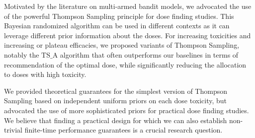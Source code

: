 Motivated by the literature on multi-armed bandit models, we advocated the use of the powerful Thompson Sampling principle for dose finding studies. This Bayesian randomized algorithm can be used in different contexts as it can leverage different prior information about the doses. For increasing toxicities and increasing or plateau efficacies, we proposed variants of Thompson Sampling, notably the $\mathrm{TS}\_\mathrm{A}$ algorithm that often outperforms our baselines in terms of recommendation of the optimal dose, while significantly reducing the allocation to doses with high toxicity. 

We provided theoretical guarantees for the simplest version of Thompson Sampling based on independent uniform priors on each dose toxicity, but advocated the use of more sophisticated priors for practical dose finding studies. We believe that finding a practical design for which we can also establish non-trivial finite-time performance guarantees is a crucial research question. 

% 
% 







